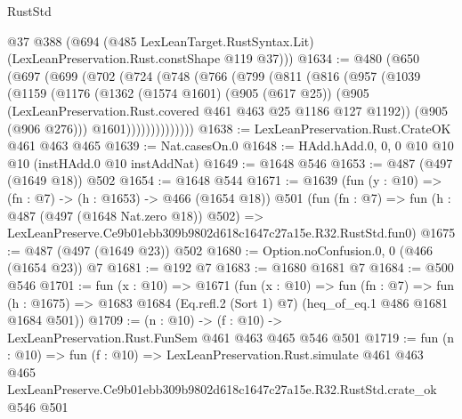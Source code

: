 \begin{lexlean}{RustStd}
\begin{coremodule}
      @37
      @388
      (@694 (@485 LexLeanTarget.RustSyntax.Lit) (LexLeanPreservation.Rust.constShape @119 @37)))
@1634 := @480
    (@650
      (@697
        (@699
          (@702
            (@724
              (@748
                (@766
                  (@799
                    (@811
                      (@816
                        (@957
                          (@1039
                            (@1159
                              (@1176
                                (@1362
                                  (@1574 @1601)
                                  (@905 (@617 @25))
                                  (@905
                                    (LexLeanPreservation.Rust.covered
                                      @461
                                      @463
                                      @25
                                      @1186
                                      @127
                                      @1192))
                                  (@905 (@906 @276)))
                                @1601))))))))))))))
@1638 := LexLeanPreservation.Rust.CrateOK @461 @463 @465
@1639 := Nat.casesOn.{0}
@1648 := HAdd.hAdd.{0, 0, 0} @10 @10 @10 (instHAdd.{0} @10 instAddNat)
@1649 := @1648 @546
@1653 := @487 (@497 (@1649 @18)) @502
@1654 := @1648 @544
@1671 := @1639
    (fun (y : @10) => (fn : @7) -> (h : @1653) -> @466 (@1654 @18))
    @501
    (fun (fn : @7) =>
    fun (h : @487 (@497 (@1648 Nat.zero @18)) @502) =>
    LexLeanPreserve.Ce9b01ebb309b9802d618c1647c27a15e.R32.RustStd.fun0)
@1675 := @487 (@497 (@1649 @23)) @502
@1680 := Option.noConfusion.{0, 0} (@466 (@1654 @23)) @7
@1681 := @192 @7
@1683 := @1680 @1681 @7
@1684 := @500 @546
@1701 := fun (x : @10) =>
  @1671
    (fun (x : @10) =>
    fun (fn : @7) =>
    fun (h : @1675) => @1683 @1684 (Eq.refl.{2} (Sort 1) @7) (heq_of_eq.{1} @486 @1681 @1684 @501))
@1709 := (n : @10) -> (f : @10) -> LexLeanPreservation.Rust.FunSem @461 @463 @465 @546 @501
@1719 := fun (n : @10) =>
  fun (f : @10) =>
  LexLeanPreservation.Rust.simulate
    @461
    @463
    @465
    LexLeanPreserve.Ce9b01ebb309b9802d618c1647c27a15e.R32.RustStd.crate_ok
    @546
    @501
\end{coremodule}
\end{lexlean}
